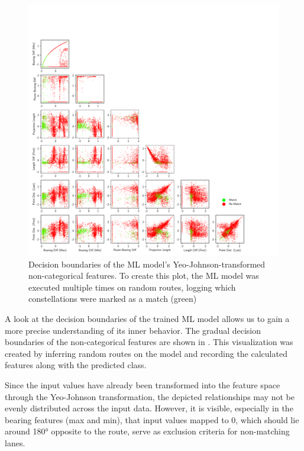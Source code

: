\begin{figure}[!t]
\centering 
\includegraphics[width=\linewidth,bb=0 0 760 760]{images/decision-boundaries.pdf}
\caption{Decision boundaries of the ML model's Yeo-Johnson-transformed non-categorical features. To create this plot, the ML model was executed multiple times on random routes, logging which constellations were marked as a match (green)}
\label{fig:ml-model-decision-boundaries}
\end{figure}

A look at the decision boundaries of the trained ML model allows us to gain a more precise understanding of its inner behavior. The gradual decision boundaries of the non-categorical features are shown in . This visualization was created by inferring random routes on the model and recording the calculated features along with the predicted class. 

Since the input values have already been transformed into the feature space through the Yeo-Johnson transformation, the depicted relationships may not be evenly distributed across the input data. However, it is visible, especially in the bearing features (max and min), that input values mapped to 0, which should lie around 180° opposite to the route, serve as exclusion criteria for non-matching lanes.

